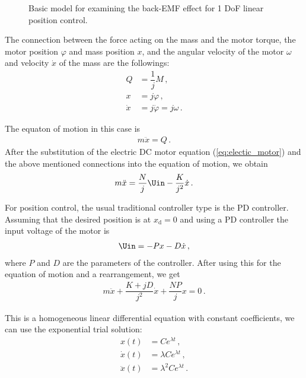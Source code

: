 \begin{figure}[h]
	\centering
	\def\svgwidth{10cm}
	
	\caption{Basic model for examining the back-EMF effect for 1 DoF linear position control.}
	\label{fig:1dof_pos_cont}
\end{figure}

\noindent
The connection between the force acting on the mass and the motor torque, the motor position $\varphi$ and mass position $x$, and the angular velocity of the motor $\omega$ and velocity $\dot x$ of the mass  are the followings:
\begin{align}
	Q &= \dfrac{1}{j}M\,, \\
	x &= j \varphi\,, \\
	\dot x &= j \dot \varphi = j \omega\,.
\end{align}

\noindent
The equaton of motion in this case is
\begin{align}
 m\ddot x = Q\,.
 \end{align}
After the substitution of the electric DC motor equation (\ref{eq:electic_motor}) and the above mentioned connections into the equation of motion, we obtain
 \begin{align}
 	m\ddot x = \dfrac{N}{j}\Uin - \dfrac{K}{j^2} \dot x\,.
 \end{align}


\noindent 
For position control, the usual traditional controller type is the PD controller. Assuming that the desired position is at $x_\mathrm{d}=0$ and using a PD controller the input voltage of the motor is
\begin{align}
	\Uin = -Px -D\dot x\,, \label{eq:PD_controller}
\end{align} 
where $P$ and $D$ are the parameters of the controller. After using this for the equation of motion and a rearrangement, we get
\begin{align}
	m\ddot x + \dfrac{K + jD}{j^2}\dot x + \dfrac{NP}{j} x = 0\,.
\end{align} 

\noindent
This is a homogeneous linear differential equation with constant coefficients, we can use the exponential trial solution:
\begin{align}
	x(t) 	  	&= C e^{\lambda t} \,, 			\\[1ex]
	\dot x(t) 	&= \lambda C  e^{\lambda t}	\,,	\\[1ex]
	\ddot x(t) 	&= \lambda^2 C  e^{\lambda t}\,.	
\end{align}

